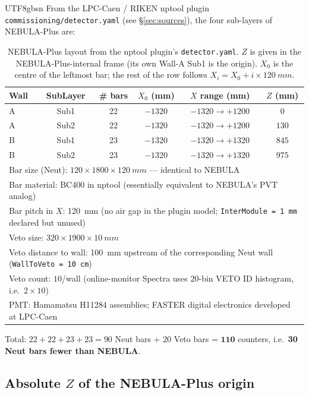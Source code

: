 \documentclass[11pt,a4paper]{article}
\newcommand{\NEB}{NEBULA}
\newcommand{\NPL}{NEBULA-Plus}
\begin{document}
\begin{CJK}{UTF8}{gbsn}
From the LPC-Caen / RIKEN nptool plugin
\texttt{commissioning/detector.yaml} (see \S\ref{sec:sources}), the four
sub-layers of \NPL{} are:

\begin{table}[h]
\centering
\caption{\NPL{} layout from the nptool plugin's \texttt{detector.yaml}.
$Z$ is given in the \NPL{}-internal frame (its own Wall-A Sub1 is the origin).
$X_{0}$ is the centre of the leftmost bar; the rest of the row follows
$X_i = X_0 + i \times \SI{120}{mm}$.}
\begin{tabular}{lccccc}
\toprule
Wall & SubLayer & \# bars & $X_0$ (mm) & $X$ range (mm) & $Z$ (mm)\\
\midrule
A & Sub1 & 22 & $-1320$ & $-1320 \to +1200$ & $0$\\
A & Sub2 & 22 & $-1320$ & $-1320 \to +1200$ & $130$\\
B & Sub1 & 23 & $-1320$ & $-1320 \to +1320$ & $845$\\
B & Sub2 & 23 & $-1320$ & $-1320 \to +1320$ & $975$\\
\midrule
\multicolumn{6}{l}{Bar size (Neut): $120 \times 1800 \times \SI{120}{mm}$ — identical to \NEB{}}\\
\multicolumn{6}{l}{Bar material: BC400 in nptool (essentially equivalent to \NEB{}'s PVT analog)}\\
\multicolumn{6}{l}{Bar pitch in $X$: \SI{120}{mm} (no air gap in the plugin model;
                  \texttt{InterModule = 1\,mm} declared but unused)}\\
\multicolumn{6}{l}{Veto size: $320 \times 1900 \times \SI{10}{mm}$}\\
\multicolumn{6}{l}{Veto distance to wall: \SI{100}{mm} upstream of the corresponding Neut wall
                  (\texttt{WallToVeto = 10\,cm})}\\
\multicolumn{6}{l}{Veto count: $10$/wall (online-monitor Spectra uses 20-bin VETO ID histogram,
                   i.e.\ $2\times10$)}\\
\multicolumn{6}{l}{PMT: Hamamatsu H11284 assemblies; FASTER digital electronics
                  developed at LPC-Caen}\\
\bottomrule
\end{tabular}
\end{table}

Total: $22+22+23+23 = 90$ Neut bars + $20$ Veto bars = $\mathbf{110}$ counters,
i.e.\ \textbf{30 Neut bars fewer than \NEB{}}.

\subsection{Absolute $Z$ of the \NPL{} origin}


\end{CJK}
\end{document}

